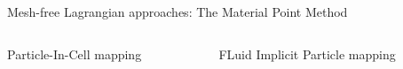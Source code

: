 \begin{withoutheadline}
\begin{frame}{Mesh-free Lagrangian approaches: The Material Point Method \cite{Sulsky94}}
\begin{columns}
\begin{column}{0.48\textwidth}
\begin{block}{\footnotesize Particle-In-Cell mapping \cite{PIC}}
        \end{block}
      \end{column}
      \begin{column}{0.48\textwidth}
        \begin{block}{\footnotesize FLuid Implicit Particle mapping \cite{PIC_Nishiguchi}}
            
        \end{block}
      \end{column}
    \end{columns}
    \vspace{-0.3cm}
  \end{frame}
\end{withoutheadline}

